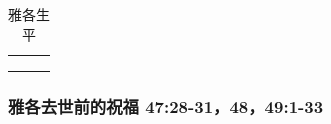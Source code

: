 \begin{table}[H]
\begin{threeparttable}
\begin{tabular}{c c c}
\multicolumn{1}{L{\dimexpr0.5\linewidth-1\tabcolsep\relax}}{\bfseries }  
& \multicolumn{1}{L{\dimexpr0.2\linewidth-1\tabcolsep\relax}}{\bfseries }
& \multicolumn{1}{L{\dimexpr0.1\linewidth-1\tabcolsep\relax}}{\bfseries }\\ 

\multicolumn{1}{L{\dimexpr0.5\linewidth-1\tabcolsep\relax}}{\bfseries }  
& \multicolumn{1}{L{\dimexpr0.2\linewidth-1\tabcolsep\relax}}{\bfseries }
& \multicolumn{1}{L{\dimexpr0.1\linewidth-1\tabcolsep\relax}}{\bfseries }\\ 

\multicolumn{1}{L{\dimexpr0.5\linewidth-1\tabcolsep\relax}}{\bfseries }  
& \multicolumn{1}{L{\dimexpr0.2\linewidth-1\tabcolsep\relax}}{\bfseries }
& \multicolumn{1}{L{\dimexpr0.1\linewidth-1\tabcolsep\relax}}{\bfseries }\\ 
\end{tabular}
\caption{雅各生平}
\label{table:YaGeLife}
\end{threeparttable}
\end{table}


\subsubsection{雅各去世前的祝福 47:28-31，48，49:1-33 }

